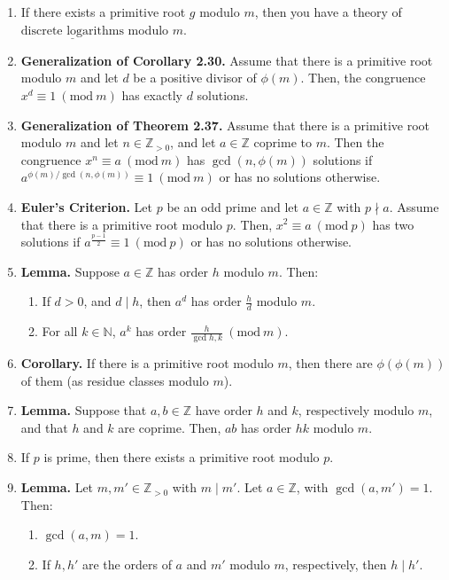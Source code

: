 \documentclass[11pt]{article}
\theoremstyle{definition}
\theoremstyle{named}
\newcommand{\Mod}[1]{\ (\mathrm{mod}\ #1)}
\begin{document}
\begin{enumerate}
\begin{enumerate}
    \end{enumerate}
    \item If there exists a primitive root $g$ modulo $m$, then you have a theory of $\underline{\textrm{discrete logarithms}}$ modulo $m$. 
    \item \textbf{Generalization of Corollary 2.30. } Assume that there is a primitive root modulo $m$ and let $d$ be a positive divisor of $\phi(m)$. Then, the congruence $x^d \equiv 1 \Mod{m}$ has exactly $d$ solutions. 
    \item \textbf{Generalization of Theorem 2.37. } Assume that there is a primitive root modulo $m$ and let $n \in \mathbb{Z}_{>0}$, and let $a \in \mathbb{Z}$ coprime to $m$. Then the congruence $x^n \equiv a \Mod{m}$ has $\gcd(n,\phi(m))$ solutions if $a^{\phi(m)/\gcd(n,\phi(m))} \equiv 1 \Mod{m}$ or has no solutions otherwise. 
    \item \textbf{Euler's Criterion. } Let $p$ be an odd prime and let $a \in \mathbb{Z}$ with $p \nmid a$. Assume that there is a primitive root modulo $p$. Then, $x^2 \equiv a \Mod{p}$ has two solutions if $a^{\frac{p-1}{2}} \equiv 1 \Mod{p}$ or has no solutions otherwise. 
    \item \textbf{Lemma. } Suppose $a \in \mathbb{Z}$ has order $h$ modulo $m$. Then: 
    \begin{enumerate}
        \item If $d>0$, and $d \mid h$, then $a^d$ has order $\frac{h}{d}$ modulo $m$. 
        \item For all $k \in \mathbb{N}$, $a^k$ has order $\frac{h}{\gcd{h,k}} \Mod{m}$. 
    \end{enumerate}
    \item \textbf{Corollary. } If there is a primitive root modulo $m$, then there are $\phi(\phi(m))$ of them (as residue classes modulo $m$). 
    \item \textbf{Lemma. } Suppose that $a,b \in \mathbb{Z}$ have order $h$ and $k$, respectively modulo $m$, and that $h$ and $k$ are coprime. Then, $ab$ has order $hk$ modulo $m$. 
    \item If $p$ is prime, then there exists a primitive root modulo $p$. 
    \item \textbf{Lemma. } Let $m,m' \in \mathbb{Z}_{>0}$ with $m \mid m'$. Let $a \in \mathbb{Z}$, with $\gcd(a,m') = 1$. Then: 
    \begin{enumerate}
        \item $\gcd(a,m) = 1$. 
        \item If $h,h'$ are the orders of $a$ and $m'$ modulo $m$, respectively, then $h \mid h'$. 

\end{enumerate}
\end{enumerate}
\end{document}
